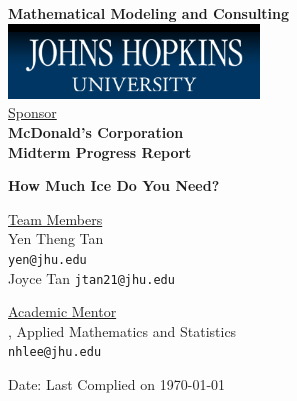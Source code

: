 \documentclass[oneside,12pt]{report}
\begin{document}
\def\thefootnote{\fnsymbol{footnote}}

\thispagestyle{empty}

\def\shiftdowna{0.32in}  %
\def\shiftdownb{0.22in}  %


\begin{center}
\textbf{{\large Mathematical Modeling and Consulting }}\\

\vspace \shiftdowna
\includegraphics[width=0.5\textwidth]{jhu.png}\\

\vspace \shiftdowna
\underline {Sponsor}\\ 
\vspace{5pt}
\textbf{\large McDonald's Corporation} \\
\vspace\shiftdowna
\textbf{{Midterm Progress Report}}

\vspace \shiftdowna
\textbf{{\Large How Much Ice Do You Need?}}

\vspace{0.35in}
\underline {Team Members}\\
\vspace{5pt}
Yen Theng Tan \\
\texttt{yen@jhu.edu} \\
\vspace{10pt}
Joyce Tan 
\texttt{jtan21@jhu.edu}

\vspace \shiftdownb
\underline {Academic Mentor} \\
\vspace{5pt}
, Applied Mathematics and Statistics\\
\texttt{nhlee@jhu.edu}


\vspace \shiftdowna
Date: Last Complied on \today

\end{center}
\end{document}
